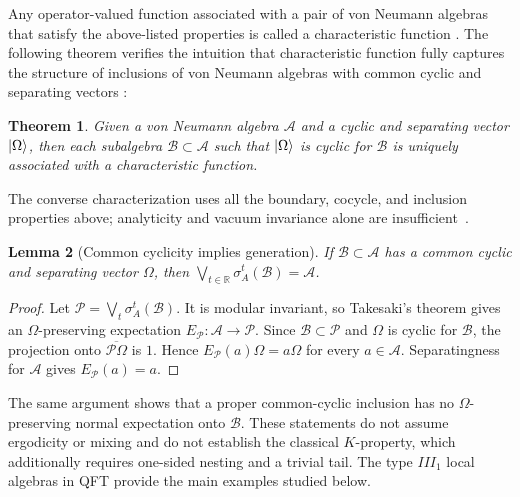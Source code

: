 \documentclass[a4paper,11pt]{article}
\newtheorem{theorem}{Theorem}
\newtheorem{lemma}[theorem]{Lemma}
\theoremstyle{definition}
\newcommand{\mA}{\mathcal{A}}
\newcommand{\mB}{\mathcal{B}}
\newcommand{\mP}{\mathcal{P}}
\begin{document}
Any operator-valued function associated with a pair of von Neumann algebras that satisfy the above-listed properties is called a characteristic function \cite{revolutionizing}. The following theorem verifies the intuition that characteristic function fully captures the structure of inclusions of von Neumann algebras with common cyclic and separating vectors \cite{revolutionizing}:
\begin{theorem}
    Given a von Neumann algebra $\mathcal{A}$ and a cyclic and separating vector $\ket{\Omega}$, then each subalgebra $\mathcal{B}\subset\mathcal{A}$ such that $\ket{\Omega}$ is cyclic for $\mathcal{B}$ is uniquely associated with a characteristic function.
\end{theorem}
The converse characterization uses all the boundary, cocycle, and inclusion properties above; analyticity and vacuum invariance alone are insufficient~\cite{revolutionizing}.


\begin{lemma}[Common cyclicity implies generation]\label{lem:common-cyclicity-generating}
If $\mB\subset\mA$ has a common cyclic and separating vector $\Omega$, then
$\bigvee_{t\in\mathbb R}\sigma_A^t(\mB)=\mA$.
\end{lemma}
\begin{proof}
Let $\mP=\bigvee_t\sigma_A^t(\mB)$. It is modular invariant, so Takesaki's theorem
gives an $\Omega$-preserving expectation $E_{\mP}:\mA\to\mP$.
Since $\mB\subset\mP$ and $\Omega$ is cyclic for $\mB$, the projection onto
$\overline{\mP\Omega}$ is $1$. Hence $E_{\mP}(a)\Omega=a\Omega$ for every $a\in\mA$.
Separatingness for $\mA$ gives $E_{\mP}(a)=a$.
\end{proof}

The same argument shows that a proper common-cyclic inclusion has no
$\Omega$-preserving normal expectation onto $\mB$.
These statements do not assume ergodicity or mixing and do not establish the
classical $K$-property, which additionally requires one-sided nesting and a trivial tail.
The type $III_1$ local algebras in QFT provide the main examples studied below.
\end{document}
